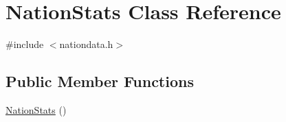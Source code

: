 \hypertarget{class_nation_stats}{}\section{Nation\+Stats Class Reference}
\label{class_nation_stats}


{\ttfamily \#include $<$nationdata.\+h$>$}

\subsection*{Public Member Functions}
\begin{DoxyCompactItemize}
\item 
\mbox{\hyperlink{class_nation_stats_a12f98b5e349b1ae02b8355a46216b9fa}{Nation\+Stats}} ()
\end{DoxyCompactItemize}
